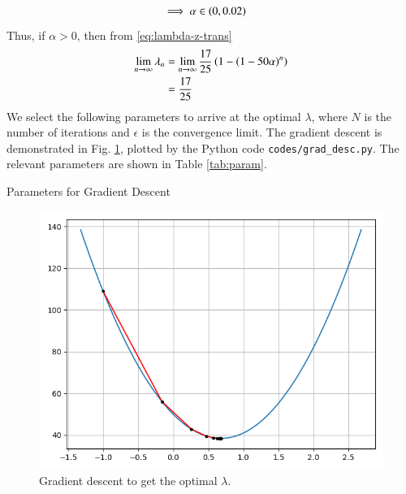 \documentclass[journal,12pt,twocolumn]{IEEEtran}
\begin{document}
\begin{enumerate}
\begin{align}
        \implies \alpha &\in \left(0,0.02\right)
        \label{eq:alpha-constr}
    \end{align}
    Thus, if $\alpha > 0$, then from \eqref{eq:lambda-z-trans}
    \begin{align}
        \lim_{n\to\infty}\lambda_n &= \lim_{n\to\infty}\frac{17}{25}\left(1-\left(1-50\alpha\right)^n\right) \\
                                   &= \frac{17}{25}
                                   \label{eq:conv}
    \end{align}
    We select the following parameters to arrive at the optimal $\lambda$,
    where $N$ is the number of iterations and $\epsilon$ is the convergence 
    limit. The gradient descent is demonstrated in Fig. \ref{fig:grad-desc},
    plotted by the Python code \texttt{codes/grad\_desc.py}. The relevant
    parameters are shown in Table \ref{tab:param}.
    \begin{table}[!ht]
        \centering
        
        \caption{Parameters for Gradient Descent}
        \label{tab:param}
    \end{table}

    \begin{figure}[!ht]
        \centering
        \includegraphics[width=\columnwidth]{figs/grad_desc.png}
        \caption{Gradient descent to get the optimal $\lambda$.}
        \label{fig:grad-desc}
    \end{figure}
\end{enumerate}
\end{document}
